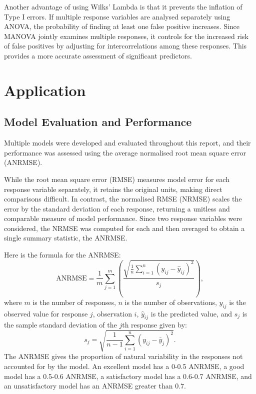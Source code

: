 \documentclass[11pt]{report} %
\begin{document}
Another advantage of using Wilks' Lambda is that it prevents the inflation of Type I errors. If multiple response variables are analysed separately using ANOVA, the probability of finding at least one false positive increases. Since MANOVA jointly examines multiple responses, it controls for the increased risk of false positives by adjusting for intercorrelations among these responses. \cite{Newsom2024MANOVA} This provides a more accurate assessment of significant predictors. 


\section{Application}
\subsection{Model Evaluation and Performance}
\label{model measurement}
Multiple models were developed and evaluated throughout this report, and their performance was assessed using the average normalised root mean square error (ANRMSE). 

While the root mean square error (RMSE) measures model error for each response variable separately, it retains the original units, making direct comparisons difficult. In contrast, the normalised RMSE (NRMSE) scales the error by the standard deviation of each response, returning a unitless and comparable measure of model performance. Since two response variables were considered, the NRMSE was computed for each and then averaged to obtain a single summary statistic, the ANRMSE.

Here is the formula for the ANRMSE:
\begin{equation}
    \text{ANRMSE} = \frac{1}{m} \sum_{j=1}^{m} \left( \frac{ \sqrt{ \frac{1}{n} \sum_{i=1}^{n} (y_{ij} - \hat{y}_{ij})^2 } }{ s_j } \right),
\label{ANRMSE Equation}
\end{equation}
\noindent
where $m$ is the number of responses, $n$ is the number of observations, \( y_{ij} \) is the observed value for response \( j \), observation \( i \), \( \hat{y}_{ij} \)  is the predicted value, and \( s_j \) is the sample standard deviation of the \( j \)th response given by:
\begin{equation}
    s_j = \sqrt{ \frac{1}{n - 1} \sum_{i=1}^{n} (y_{ij} - \bar{y}_j)^2 }.
    \label{sd}
\end{equation}
The ANRMSE gives the proportion of natural variability in the responses not accounted for by the model. An excellent model has a 0-0.5 ANRMSE, a good model has a 0.5-0.6 ANRMSE, a satisfactory model has a 0.6-0.7 ANRMSE, and an unsatisfactory model has an ANRMSE greater than $0.7$.\cite{moriasi2007model} 
\end{document}
